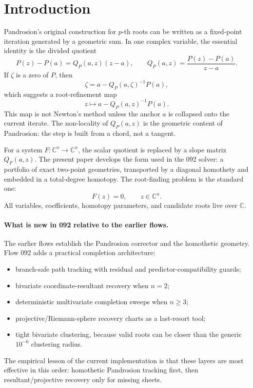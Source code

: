 \documentclass[11pt,a4paper]{article}
\theoremstyle{definition}
\theoremstyle{plain}
\theoremstyle{remark}
\newcommand{\C}{\mathbb C}
\begin{document}
\tableofcontents

\section{Introduction}

Pandrosion's original construction for \(p\)-th roots can be written as a
fixed-point iteration generated by a geometric sum.  In one complex variable,
the essential identity is the divided quotient
\[
  P(z)-P(a)=Q_P(a,z)(z-a),
  \qquad
  Q_P(a,z)=\frac{P(z)-P(a)}{z-a}.
\]
If \(\zeta\) is a zero of \(P\), then
\[
  \zeta
  =
  a-Q_P(a,\zeta)^{-1}P(a),
\]
which suggests a root-refinement map
\[
  z\longmapsto a-Q_P(a,z)^{-1}P(a).
\]
This map is not Newton's method unless the anchor \(a\) is collapsed onto the
current iterate.  The non-locality of \(Q_P(a,z)\) is the geometric content of
Pandrosion: the step is built from a chord, not a tangent.

For a system \(F:\C^n\to\C^n\), the scalar quotient is replaced by a slope
matrix \(Q_F(a,z)\).  The present paper develops the form used in the 092
solver: a portfolio of exact two-point geometries, transported by a diagonal
homothety and embedded in a total-degree homotopy.  The root-finding problem is
the standard one:
\[
  F(z)=0,\qquad z\in\C^n.
\]
All variables, coefficients, homotopy parameters, and candidate roots live over
\(\C\).

\paragraph{What is new in 092 relative to the earlier flows.}
The earlier flows establish the Pandrosion corrector and the homothetic
geometry.  Flow 092 adds a practical completion architecture:
\begin{itemize}[leftmargin=2em]
  \item branch-safe path tracking with residual and predictor-compatibility
  guards;
  \item bivariate coordinate-resultant recovery when \(n=2\);
  \item deterministic multivariate completion sweeps when \(n\ge3\);
  \item projective/Riemann-sphere recovery charts as a last-resort tool;
  \item tight bivariate clustering, because valid roots can be closer than the
  generic \(10^{-6}\) clustering radius.
\end{itemize}
The empirical lesson of the current implementation is that these layers are
most effective in this order: homothetic Pandrosion tracking first, then
resultant/projective recovery only for missing sheets.
\end{document}
